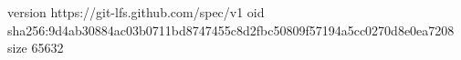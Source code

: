 version https://git-lfs.github.com/spec/v1
oid sha256:9d4ab30884ac03b0711bd8747455c8d2fbc50809f57194a5cc0270d8e0ea7208
size 65632
